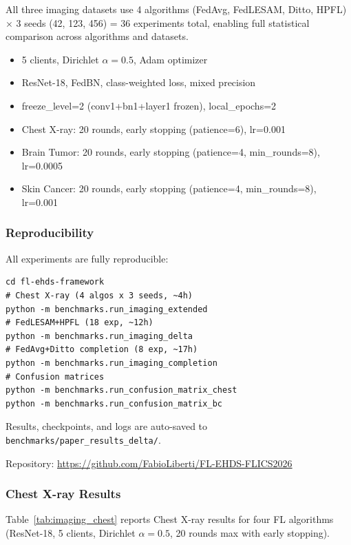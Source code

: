 \documentclass[conference]{IEEEtran}
\begin{document}
All three imaging datasets use 4 algorithms (FedAvg, FedLESAM, Ditto, HPFL) $\times$ 3 seeds (42, 123, 456) = 36 experiments total, enabling full statistical comparison across algorithms and datasets.

\begin{itemize}
    \item 5 clients, Dirichlet $\alpha{=}0.5$, Adam optimizer
    \item ResNet-18, FedBN, class-weighted loss, mixed precision
    \item freeze\_level=2 (conv1+bn1+layer1 frozen), local\_epochs=2
    \item Chest X-ray: 20 rounds, early stopping (patience=6), lr=0.001
    \item Brain Tumor: 20 rounds, early stopping (patience=4, min\_rounds=8), lr=0.0005
    \item Skin Cancer: 20 rounds, early stopping (patience=4, min\_rounds=8), lr=0.001
\end{itemize}

\subsubsection{Reproducibility}

All experiments are fully reproducible:
{\scriptsize
\begin{verbatim}
cd fl-ehds-framework
# Chest X-ray (4 algos x 3 seeds, ~4h)
python -m benchmarks.run_imaging_extended
# FedLESAM+HPFL (18 exp, ~12h)
python -m benchmarks.run_imaging_delta
# FedAvg+Ditto completion (8 exp, ~17h)
python -m benchmarks.run_imaging_completion
# Confusion matrices
python -m benchmarks.run_confusion_matrix_chest
python -m benchmarks.run_confusion_matrix_bc
\end{verbatim}
}

Results, checkpoints, and logs are auto-saved to \texttt{benchmarks/paper\_results\_delta/}.

Repository: \url{https://github.com/FabioLiberti/FL-EHDS-FLICS2026}

\subsubsection{Chest X-ray Results}
\label{sec:imaging_results}

Table~\ref{tab:imaging_chest} reports Chest X-ray results for four FL algorithms (ResNet-18, 5 clients, Dirichlet $\alpha{=}0.5$, 20 rounds max with early stopping).
\end{document}
